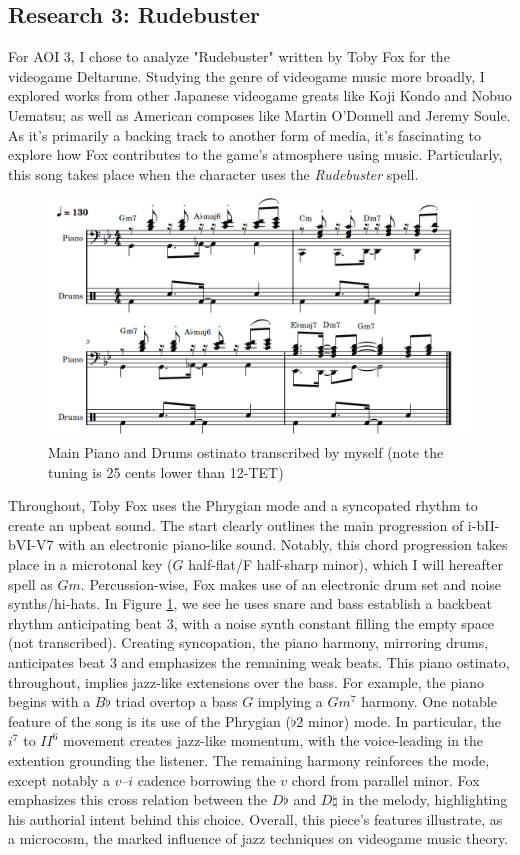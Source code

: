 \documentclass[11pt,a4paper]{article}
\begin{document}
\subsection{Research 3: Rudebuster}

For AOI 3, I chose to analyze "Rudebuster"\autocite{rudebuster} written by Toby Fox for the videogame Deltarune. Studying the genre of videogame music more broadly, I explored works from other Japanese videogame greats like Koji Kondo and Nobuo Uematsu; as well as American composes like Martin O'Donnell and Jeremy Soule. As it's primarily a backing track to another form of media, it's fascinating to explore how Fox contributes to the game's atmosphere using music. Particularly, this song takes place when the character uses the \textit{Rudebuster} spell.
\begin{figure}[ht]
\centering
\includegraphics[width=0.85\linewidth]{rudebuster}
\caption{Main Piano and Drums ostinato transcribed by myself (note the tuning is 25 cents lower than 12-TET)}
\label{fig:rude}
\end{figure}

Throughout, Toby Fox uses the Phrygian mode and a syncopated rhythm to create an upbeat sound. The start clearly outlines the main progression of i-bII-bVI-V7 with an electronic piano-like sound. Notably, this chord progression takes place in a microtonal key ($G$ half-flat/F half-sharp minor), which I will hereafter spell as $Gm$. Percussion-wise, Fox makes use of an electronic drum set and noise synths/hi-hats. In 
Figure \ref{fig:rude}, we see he uses snare and bass establish a backbeat rhythm anticipating beat 3, with a noise synth constant filling the empty space (not transcribed). Creating syncopation, the piano harmony, mirroring drums, anticipates beat 3 and emphasizes the remaining weak beats. This piano ostinato, throughout, implies jazz-like extensions over the bass. For example, the piano begins with a $B\flat$ triad overtop a bass $G$ implying a $Gm^7$ harmony.
One notable feature of the song is its use of the Phrygian ($\flat 2$ minor) mode. In particular, the $i^{7}$ to $II^6$ movement creates jazz-like momentum, with the voice-leading in the extention grounding the listener. The remaining harmony reinforces the mode, except notably a $v–i$ cadence borrowing the $v$ chord from parallel minor. Fox emphasizes this cross relation between the $D\flat$ and $D\natural$ in the melody, highlighting his authorial intent behind this choice. Overall, this piece's features illustrate, as a microcosm, the marked influence of jazz techniques on videogame music theory.
\end{document}

